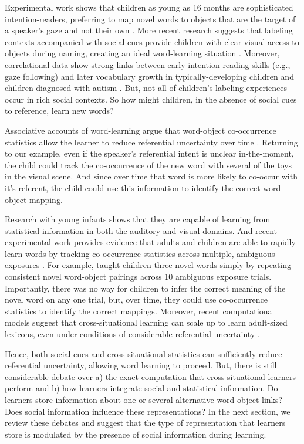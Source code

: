 \documentclass[man]{apa2}
\begin{document}
Experimental work shows that children as young as 16 months are sophisticated intention-readers, preferring to map novel words to objects that are the target of a speaker's gaze and not their own \cite{baldwin1993infants,baldwin2001links}. More recent research suggests that labeling contexts accompanied with social cues provide children with clear visual access to objects during naming, creating an ideal word-learning situation \cite{yu2012embodied}. Moreover, correlational data show strong links between early intention-reading skills (e.g., gaze following) and later vocabulary growth in typically-developing children \cite{brooks2008infant} and children diagnosed with autism \cite{mundy1990longitudinal}. But, not all of children's labeling experiences occur in rich social contexts. So how might children, in the absence of social cues to reference, learn new words? 

Associative accounts of word-learning argue that word-object co-occurrence statistics allow the learner to reduce referential uncertainty over time  \cite{smith2000learning}. Returning to our example, even if the speaker's referential intent is unclear in-the-moment, the child could track the co-occurrence of the new word with several of the toys in the visual scene. And since over time that word is more likely to co-occur with it's referent, the child could use this information to identify the correct word-object mapping. 

Research with young infants shows that they are capable of learning from statistical information in both the auditory \cite{saffran1996statistical} and visual \cite{fiser2002statistical} domains. And recent experimental work provides evidence that adults and children are able to rapidly learn words by tracking co-occurrence statistics across multiple, ambiguous exposures \cite{smith2008infants, vouloumanos2008fine}. For example,  taught children three novel words simply by repeating consistent novel word-object pairings across 10 ambiguous exposure trials.  Importantly, there was no way for children to infer the correct meaning of the novel word on any one trial, but, over time, they could use co-occurrence statistics to identify the correct mappings. Moreover, recent computational models suggest that cross-situational learning can scale up to learn adult-sized lexicons, even under conditions of considerable referential uncertainty \cite{smith2011cross}.

Hence, both social cues and cross-situational statistics can sufficiently reduce referential uncertainty, allowing word learning to proceed. But, there is still considerable debate over a) the exact computation that cross-situational learners perform and b) how learners integrate social and statistical information. Do learners store information about one or several alternative word-object links? Does social information influence these representations? In the next section, we review these debates and suggest that the type of representation that learners store is modulated by the presence of social information during learning. 
\end{document}
